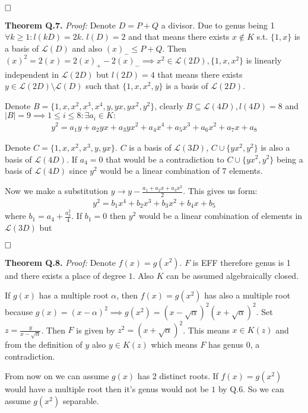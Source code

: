 \documentclass[12pt, a4paper]{article}
\newcommand{\qed}{\hfill\square}
\begin{document}
$\qed$

\textbf{Theorem Q.7.} \textit{Proof:}
Denote $D = P + Q$ a divisor. Due to genus being 1 $\forall k\geq 1: l(kD) = 2k$. $l(D)=2$ and that means there exists $x \notin K$ s.t. $\{1,x\}$ is a basis of $\mathcal{L}(D)$ and also $(x)_{-} \leq P+Q$. Then $(x)^2 = 2(x) = 2(x)_{+}-2(x)_{-} \implies x^2 \in \mathcal{L}(2D),\{1,x,x^2\}$ is linearly independent in $\mathcal{L}(2D)$ but $l(2D)=4$ that means there exists $y \in \mathcal{L}(2D)\setminus \mathcal{L}(D)$ such that $\{1,x,x^2,y\}$ is a basis of $\mathcal{L}(2D)$. 

Denote $B = \{1,x,x^2,x^3,x^4,y,yx,yx^2,y^2\}$, clearly $B \subseteq \mathcal{L}(4D), l(4D)=8$ and $|B|=9 \implies 1 \leq i \leq 8: \exists a_i \in K:$
\begin{gather*}
y^2 = a_1y + a_2yx + a_3yx^2 + a_4x^4 + a_5x^3 + a_6x^2 + a_7x+ a_8
\end{gather*}

Denote $C = \{1,x,x^2,x^3,y,yx\}$. $C$ is a basis of $\mathcal{L}(3D)$, $C \cup \{yx^2,y^2\}$ is also a basis of $\mathcal{L}(4D)$. If $a_4=0$ that would be a contradiction to $C \cup \{yx^2,y^2\}$ being a basis of $\mathcal{L}(4D)$ since $y^2$ would be a linear combination of 7 elements.

Now we make a substitution $y \rightarrow y - \frac{a_1+a_2x+a_3x^2}{2}$. This gives us form:
\begin{gather*}
y^2 =b_1x^4 + b_2x^3 + b_3x^2 + b_4x+ b_5
\end{gather*}
where $b_1 = a_4+\frac{a_3^2}{4}$. If $b_1=0$ then $y^2$ would be a linear combination of elements in $\mathcal{L}(3D)$ but 

$\qed$

\textbf{Theorem Q.8.} \textit{Proof:}
Denote $f(x) = g(x^2)$. $F$ is EFF therefore genus is 1 and there exists a place of degree $1$. Also $K$ can be assumed algebraically closed.

If $g(x)$ has a multiple root $\alpha$, then $f(x)=g(x^2)$ has also a multiple root because $g(x)=(x-\alpha)^2 \implies g(x^2) = (x-\sqrt{\alpha})^2(x+\sqrt{\alpha})^2$. Set $z = \frac{y}{x-\sqrt{\alpha}}$. Then $F$ is given by $z^2=(x+\sqrt{\alpha})^2$. This means $x \in K(z)$ and from the definition of $y$ also $y \in K(z)$ which means $F$ has genus 0, a contradiction.

From now on we can assume $g(x)$ has 2 distinct roots. If $f(x)=g(x^2)$ would have a multiple root then it's genus would not be $1$ by Q.6. So we can assume $g(x^2)$ separable. 
\end{document}

